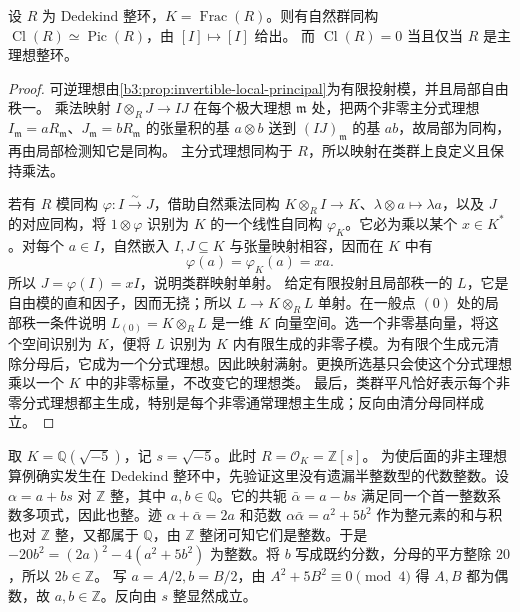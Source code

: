 \begin{proposition}\label{b3:prop:dedekind-picard-class}
	设 \(R\) 为 Dedekind 整环，\(K=\operatorname{Frac}(R)\)。则有自然群同构 \(\operatorname{Cl}(R)\simeq\operatorname{Pic}(R)\)，由 \([I]\mapsto[I]\) 给出。 而 \(\operatorname{Cl}(R)=0\) 当且仅当 \(R\) 是主理想整环。
\end{proposition}
\begin{proof}
	可逆理想由\cref{b3:prop:invertible-local-principal}为有限投射模，并且局部自由秩一。 乘法映射 \(I\otimes_RJ\rightarrow IJ\) 在每个极大理想 \(\mathfrak m\) 处，把两个非零主分式理想 \(I_{\mathfrak m}=aR_{\mathfrak m}\)、\(J_{\mathfrak m}=bR_{\mathfrak m}\) 的张量积的基 \(a\otimes b\) 送到 \((IJ)_{\mathfrak m}\) 的基 \(ab\)，故局部为同构，再由局部检测知它是同构。 主分式理想同构于 \(R\)，所以映射在类群上良定义且保持乘法。

	若有 \(R\) 模同构 \(\varphi:I\xrightarrow{\sim}J\)，借助自然乘法同构 \(K\otimes_RI\to K\)、\(\lambda\otimes a\mapsto\lambda a\)，以及 \(J\) 的对应同构，将 \(1\otimes\varphi\) 识别为 \(K\) 的一个线性自同构 \(\varphi_K\)。它必为乘以某个 \(x\in K^*\)。对每个 \(a\in I\)，自然嵌入 \(I,J\subseteq K\) 与张量映射相容，因而在 \(K\) 中有
	\[
		\varphi(a)=\varphi_K(a)=xa.
	\]
	所以 \(J=\varphi(I)=xI\)，说明类群映射单射。 给定有限投射且局部秩一的 \(L\)，它是自由模的直和因子，因而无挠；所以 \(L\rightarrow K\otimes_RL\) 单射。在一般点 \((0)\) 处的局部秩一条件说明 \(L_{(0)}=K\otimes_RL\) 是一维 \(K\) 向量空间。选一个非零基向量，将这个空间识别为 \(K\)，便将 \(L\) 识别为 \(K\) 内有限生成的非零子模。为有限个生成元清除分母后，它成为一个分式理想。因此映射满射。更换所选基只会使这个分式理想乘以一个 \(K\) 中的非零标量，不改变它的理想类。 最后，类群平凡恰好表示每个非零分式理想都主生成，特别是每个非零通常理想主生成；反向由清分母同样成立。
\end{proof}

取 \(K=\mathbb Q(\sqrt{-5})\)，记 \(s=\sqrt{-5}\)。此时 \(R=\mathcal O_K=\mathbb Z[s]\)。 为使后面的非主理想算例确实发生在 Dedekind 整环中，先验证这里没有遗漏半整数型的代数整数。设 \(\alpha=a+bs\) 对 \(\mathbb Z\) 整，其中 \(a,b\in\mathbb Q\)。它的共轭 \(\bar\alpha=a-bs\) 满足同一个首一整数系数多项式，因此也整。迹 \(\alpha+\bar\alpha=2a\) 和范数 \(\alpha\bar\alpha=a^2+5b^2\) 作为整元素的和与积也对 \(\mathbb Z\) 整，又都属于 \(\mathbb Q\)，由 \(\mathbb Z\) 整闭可知它们是整数。于是 \(-20b^2=(2a)^2-4(a^2+5b^2)\) 为整数。将 \(b\) 写成既约分数，分母的平方整除 \(20\)，所以 \(2b\in\mathbb Z\)。 写 \(a=A/2,b=B/2\)，由 \(A^2+5B^2\equiv0\pmod4\) 得 \(A,B\) 都为偶数，故 \(a,b\in\mathbb Z\)。反向由 \(s\) 整显然成立。

